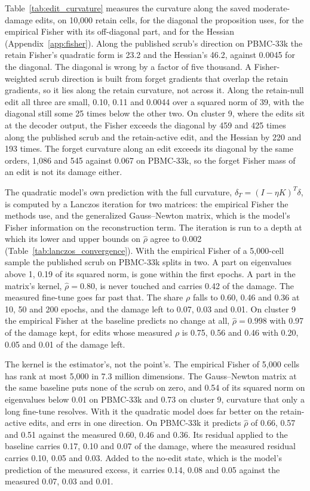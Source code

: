 \documentclass{article}
\begin{document}
Table~\ref{tab:edit_curvature} measures the curvature along the saved moderate-damage edits, on 10,000 retain cells, for the diagonal the proposition uses, for the empirical Fisher with its off-diagonal part, and for the Hessian (Appendix~\ref{app:fisher}). Along the published scrub's direction on PBMC-33k the retain Fisher's quadratic form is 23.2 and the Hessian's 46.2, against 0.0045 for the diagonal. The diagonal is wrong by a factor of five thousand. A Fisher-weighted scrub direction is built from forget gradients that overlap the retain gradients, so it lies along the retain curvature, not across it. Along the retain-null edit all three are small, 0.10, 0.11 and 0.0044 over a squared norm of 39, with the diagonal still some 25 times below the other two. On cluster 9, where the edits sit at the decoder output, the Fisher exceeds the diagonal by 459 and 425 times along the published scrub and the retain-active edit, and the Hessian by 220 and 193 times. The forget curvature along an edit exceeds its diagonal by the same orders, 1,086 and 545 against 0.067 on PBMC-33k, so the forget Fisher mass of an edit is not its damage either.

The quadratic model's own prediction with the full curvature, $\delta_T = (I - \eta K)^T\delta$, is computed by a Lanczos iteration for two matrices: the empirical Fisher the methods use, and the generalized Gauss--Newton matrix, which is the model's Fisher information on the reconstruction term. The iteration is run to a depth at which its lower and upper bounds on $\hat\rho$ agree to 0.002 (Table~\ref{tab:lanczos_convergence}). With the empirical Fisher of a 5,000-cell sample the published scrub on PBMC-33k splits in two. A part on eigenvalues above 1, 0.19 of its squared norm, is gone within the first epochs. A part in the matrix's kernel, $\hat\rho = 0.80$, is never touched and carries 0.42 of the damage. The measured fine-tune goes far past that. The share $\rho$ falls to 0.60, 0.46 and 0.36 at 10, 50 and 200 epochs, and the damage left to 0.07, 0.03 and 0.01. On cluster 9 the empirical Fisher at the baseline predicts no change at all, $\hat\rho = 0.998$ with 0.97 of the damage kept, for edits whose measured $\rho$ is 0.75, 0.56 and 0.46 with 0.20, 0.05 and 0.01 of the damage left.

The kernel is the estimator's, not the point's. The empirical Fisher of 5,000 cells has rank at most 5,000 in 7.3 million dimensions. The Gauss--Newton matrix at the same baseline puts none of the scrub on zero, and 0.54 of its squared norm on eigenvalues below 0.01 on PBMC-33k and 0.73 on cluster 9, curvature that only a long fine-tune resolves. With it the quadratic model does far better on the retain-active edits, and errs in one direction. On PBMC-33k it predicts $\hat\rho$ of 0.66, 0.57 and 0.51 against the measured 0.60, 0.46 and 0.36. Its residual applied to the baseline carries 0.17, 0.10 and 0.07 of the damage, where the measured residual carries 0.10, 0.05 and 0.03. Added to the no-edit state, which is the model's prediction of the measured excess, it carries 0.14, 0.08 and 0.05 against the measured 0.07, 0.03 and 0.01.
\end{document}
